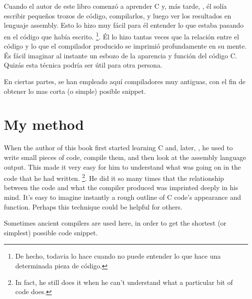 \ifdefined\SPANISH
\chapter{\ESph{}}

Cuando el autor de este libro comenzó a aprender C y, más tarde, \Cpp, él solía escribir pequeños trozos de código, compilarlos, 
y luego ver los resultados en lenguaje assembly. Esto lo hizo muy fácil para él entender lo que estaba pasando en el código que había escrito.
\footnote{De hecho, todavia lo hace cuando no puede entender lo que hace una determinada pieza de código.}. 
Él lo hizo tantas veces que la relación entre el código \CCpp y lo que el compilador producido se imprimió profundamente en su mente. 
És fácil imaginar al instante un esbozo de la aparencia y función del código C. 
Quizás esta técnica podría ser útil para otra persona.


En ciertas partes, se han empleado aquí compiladores muy antiguas, con el fin de obtener lo mas corta (o simple) posible snippet.
\fi %

\ifdefined\ENGLISH
\chapter{My method}

When the author of this book first started learning C and, later, \Cpp, he used to write small pieces of code, compile them, 
and then look at the assembly language output. This made it very easy for him to understand what was going on in the code that he had written.
\footnote{In fact, he still does it when he can't understand what a particular bit of code does.}. 
He did it so many times that the relationship between the \CCpp code and what the compiler produced was imprinted deeply in his mind. 
It's easy to imagine instantly a rough outline of C code's appearance and function. 
Perhaps this technique could be helpful for others.


Sometimes ancient compilers are used here, in order to get the shortest (or simplest) possible code snippet.
\fi %

\ifdefined\RUSSIAN
